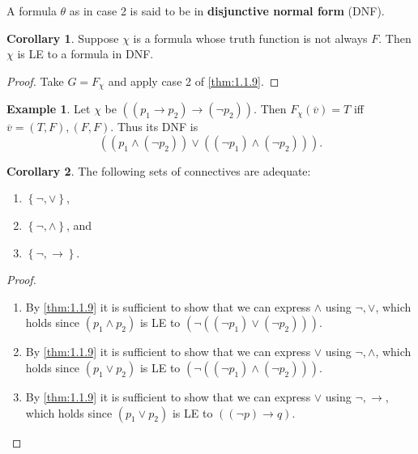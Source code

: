\documentclass{article}
\newcommand{\rb}[1]{\left( #1 \right)}
\newcommand{\cb}[1]{\left\{ #1 \right\}}
\newcommand{\notb}[1]{\rb{\neg #1}}
\newcommand{\orb}[2]{\rb{#1 \lor #2}}
\newcommand{\andb}[2]{\rb{#1 \land #2}}
\newcommand{\impb}[2]{\rb{#1 \rightarrow #2}}
\theoremstyle{definition}\newtheorem{definition}{Definition}[subsection]
\theoremstyle{definition}\newtheorem{remark}[definition]{Remark}
\theoremstyle{definition}\newtheorem*{example}{Example}
\theoremstyle{definition}\newtheorem*{note}{Note}
\newtheorem{corollary}[definition]{Corollary}
\begin{document}
A formula $ \theta $ as in case 2 is said to be in \textbf{disjunctive normal form} (DNF).

\begin{corollary}
Suppose $ \chi $ is a formula whose truth function is not always $ F $. Then $ \chi $ is LE to a formula in DNF.
\end{corollary}

\begin{proof}
Take $ G = F_\chi $ and apply case 2 of \ref{thm:1.1.9}.
\end{proof}

\begin{example}
Let $ \chi $ be $ \impb{\impb{p_1}{p_2}}{\notb{p_2}} $. Then $ F_\chi\rb{\overline{v}} = T $ iff $ \overline{v} = \rb{T, F}, \rb{F, F} $. Thus its DNF is
$$ \orb{\andb{p_1}{\notb{p_2}}}{\andb{\notb{p_1}}{\notb{p_2}}}. $$
\end{example}

\begin{corollary}
The following sets of connectives are adequate:
\begin{enumerate}
\item $ \cb{\neg, \lor} $,
\item $ \cb{\neg, \land} $, and
\item $ \cb{\neg, \rightarrow} $.
\end{enumerate}
\end{corollary}

\begin{proof}
\hfill
\begin{enumerate}
\item By \ref{thm:1.1.9} it is sufficient to show that we can express $ \land $ using $ \neg, \lor $, which holds since $ \andb{p_1}{p_2} $ is LE to $ \notb{\orb{\notb{p_1}}{\notb{p_2}}} $.
\item By \ref{thm:1.1.9} it is sufficient to show that we can express $ \lor $ using $ \neg, \land $, which holds since $ \orb{p_1}{p_2} $ is LE to $ \notb{\andb{\notb{p_1}}{\notb{p_2}}} $.
\item By \ref{thm:1.1.9} it is sufficient to show that we can express $ \lor $ using $ \neg, \rightarrow $, which holds since $ \orb{p_1}{p_2} $ is LE to $ \impb{\notb{p}}{q} $.
\end{enumerate}
\end{proof}

\end{document}
